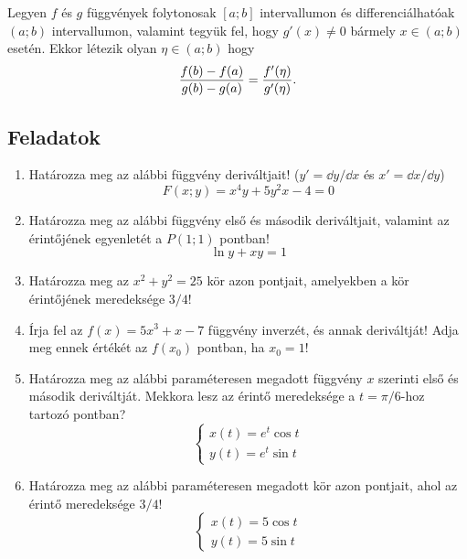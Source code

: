 \documentclass[a4paper, 12pt]{scrartcl}
\begin{document}
\begin{theorem}
  Legyen $f$ és $g$ függvények folytonosak $[a; b]$ intervallumon és
  differenciálhatóak $(a; b)$ intervallumon, valamint tegyük fel, hogy $g'(x)
    \neq 0$ bármely $x \in (a; b)$ esetén. Ekkor létezik olyan $\eta \in
    (a; b)$
  hogy
  \[
    \frac{f(b)-f(a)}{g(b)-g(a)} = \frac{f'(\eta)}{g'(\eta)}
    \text.
  \]
\end{theorem}

\clearpage
\subsection{Feladatok}

\begin{enumerate}
  \item Határozza meg az alábbi függvény deriváltjait!
        ($y' = \dd y / \dd x$ és $x' = \dd x / \dd y$)
        \[
          F(x; y) = x^4 y + 5 y^2 x- 4 = 0
        \]

  \item Határozza meg az alábbi függvény első és második deriváltjait, valamint
        az érintőjének egyenletét a $P(1;1)$ pontban!
        \[
          \ln y + xy = 1
        \]

  \item Határozza meg az $x^2 + y^2 = 25$ kör azon pontjait, amelyekben a kör
        érintőjének meredeksége $3/4$!

  \item Írja fel az $f(x) = 5 x^3 + x - 7$ függvény inverzét, és annak
        deriváltját! Adja meg ennek értékét az $f(x_0)$ pontban, ha $x_0 = 1$!

  \item Határozza meg az alábbi paraméteresen megadott függvény $x$ szerinti
        első és második deriváltját. Mekkora lesz az érintő meredeksége a
        $t = \pi / 6$-hoz tartozó pontban?
        \[
          \begin{cases}
            x(t) = e^t \cos t \\
            y(t) = e^t \sin t
          \end{cases}
        \]

  \item Határozza meg az alábbi paraméteresen megadott kör azon pontjait,
        ahol az érintő meredeksége $3/4$!
        \[
          \begin{cases}
            x(t) = 5 \cos t \\
            y(t) = 5 \sin t
          \end{cases}
        \]


\end{enumerate}
\end{document}
